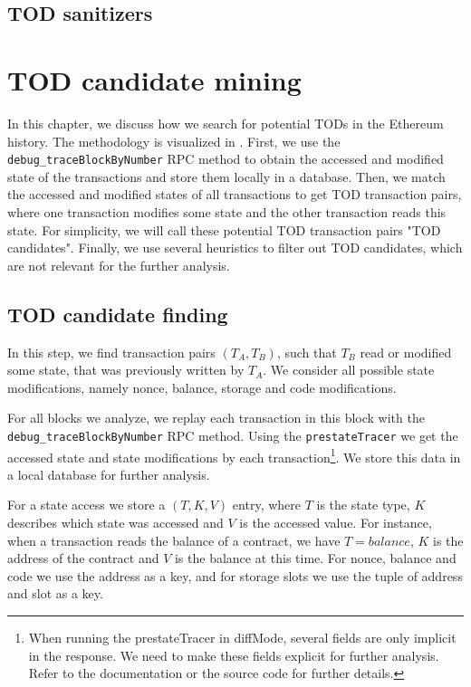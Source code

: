 \documentclass[draft,final]{vutinfth} %
\begin{document}
\section{TOD sanitizers}

\chapter{TOD candidate mining}

In this chapter, we discuss how we search for potential TODs in the Ethereum history. The methodology is visualized in . First, we use the \verb|debug_traceBlockByNumber| RPC method to obtain the accessed and modified state of the transactions and store them locally in a database. Then, we match the accessed and modified states of all transactions to get TOD transaction pairs, where one transaction modifies some state and the other transaction reads this state. For simplicity, we will call these potential TOD transaction pairs "TOD candidates". Finally, we use several heuristics to filter out TOD candidates, which are not relevant for the further analysis.


\section{TOD candidate finding}

In this step, we find transaction pairs $(T_A, T_B)$, such that $T_B$ read or modified some state, that was previously written by $T_A$. We consider all possible state modifications, namely nonce, balance, storage and code modifications.

For all blocks we analyze, we replay each transaction in this block with the \verb|debug_traceBlockByNumber| RPC method. Using the \verb|prestateTracer| we get the accessed state and state modifications by each transaction\footnote{When running the prestateTracer in diffMode, several fields are only implicit in the response. We need to make these fields explicit for further analysis. Refer to the documentation or the source code for further details.}. We store this data in a local database for further analysis.

For a state access we store a $(T, K, V)$ entry, where $T$ is the state type, $K$ describes which state was accessed and $V$ is the accessed value. For instance, when a transaction reads the balance of a contract, we have $T = balance$, $K$ is the address of the contract and $V$ is the balance at this time. For nonce, balance and code we use the address as a key, and for storage slots we use the tuple of address and slot as a key.
\end{document}
